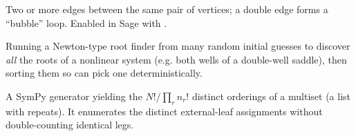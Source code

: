 \begin{description}[leftmargin=0pt,style=nextline]
  \item[Multi-edge (multigraph)] Two or more edges between the same pair of
        vertices; a double edge forms a ``bubble'' loop. Enabled in Sage with
        .

  \item[Multi-start Newton] Running a Newton-type root finder from many random
        initial guesses to discover \emph{all} the roots of a nonlinear system (e.g.
        both wells of a double-well saddle), then sorting them so
         can pick one deterministically.

  \item[\code{multiset\_permutations} (SymPy)] A SymPy generator yielding the
        $N!/\prod_r n_r!$ distinct orderings of a multiset (a list with repeats). It
        enumerates the distinct external-leaf assignments without double-counting
        identical legs.
\end{description}

